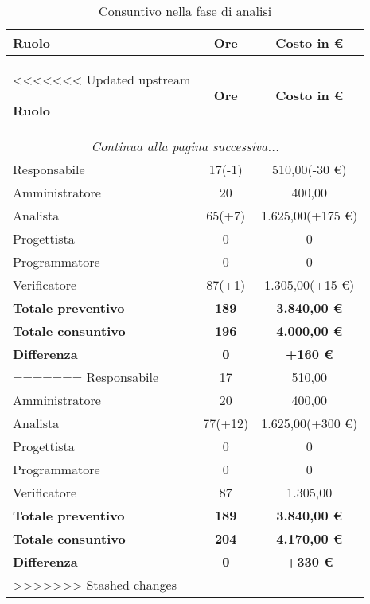 \documentclass[../piano_di_progetto.tex]{subfiles}
\begin{document}
\begin{center}
	\begin{longtable}{|l|c|c|}
		\hline
		\rowcolor{lightgray}
		\textbf{Ruolo} & \textbf{Ore} & \textbf{Costo in €}\\
		\hline
<<<<<<< Updated upstream

		\endfirsthead
	
		\hline
		\rowcolor{lightgray}
		\textbf{Ruolo} & \textbf{Ore} & \textbf{Costo in €}\\
		\hline
		\endhead
		
		\hline
		\multicolumn{3}{|c|}{\emph{Continua alla pagina successiva...}}\\
		\hline
		\endfoot

		\endlastfoot

		Responsabile & 17(-1) & 510,00(-30 €) \\
		Amministratore & 20 & 400,00 \\
		Analista & 65(+7) & 1.625,00(+175 €) \\
		Progettista & 0 & 0 \\
		Programmatore & 0 & 0 \\
		Verificatore & 87(+1) & 1.305,00(+15 €) \\
		\textbf{Totale preventivo} & \textbf{189} & \textbf{3.840,00 €} \\
		\textbf{Totale consuntivo} & \textbf{196} & \textbf{4.000,00 €} \\
		\textbf{Differenza} & \textbf{0} & \textbf{+160 €}\\
=======
		Responsabile &   17      & 510,00 \\
		\hline
		Amministratore & 20      & 400,00 \\
		\hline
		Analista &       77(+12) & 1.625,00(+300 €) \\
		\hline
		Progettista &    0       & 0 \\
		\hline
		Programmatore &  0       & 0 \\
		\hline
		Verificatore &   87      & 1.305,00 \\
		\hline
		\textbf{Totale preventivo} & \textbf{189} & \textbf{3.840,00 €} \\
		\hline
		\textbf{Totale consuntivo} & \textbf{204} & \textbf{4.170,00 €} \\
		\hline
		\textbf{Differenza} & \textbf{0} & \textbf{+330 €}\\
>>>>>>> Stashed changes
		\hline
		\rowcolor{white}
		\caption{Consuntivo nella fase di analisi}
	\end{longtable}
\end{center}
\end{document}
